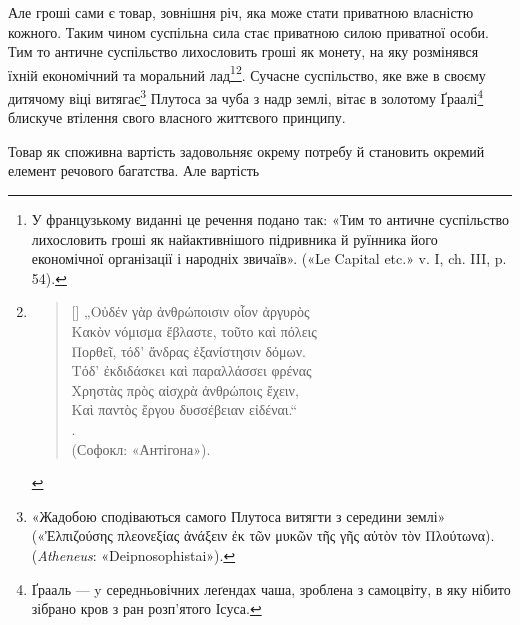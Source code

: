 Але гроші сами є товар, зовнішня річ, яка може стати приватною
власністю кожного. Таким чином суспільна сила стає приватною
силою приватної особи. Тим то античне суспільство лихословить
гроші як монету, на яку розмінявся їхній економічний та моральний
лад\footnote*{
У французькому виданні це речення подано так: «Тим то
античне суспільство лихословить гроші як найактивнішого підривника й руїнника
його економічної організації і народніх звичаїв». («Le Capital etc.» v. I,
ch. III, p. 54). 
}\footnote{
\settowidth{\versewidth}{В усякій справі путь показує безбожну].}
\begin{verse}[\versewidth]
\vspace{-\dimexpr\baselineskip+\topsep}
\textgreek{„Οὐδέν γὰρ ἀνθρώποισιν οἷον ἀργυρὸς \\
Κακὸν νόμισμα ἔβλαστε, τοῦτο καὶ πόλεις \\
Πορθεῖ, τόδ' ἄνδρας ἐξανίστησιν δόμων. \\
Τόδ’ ἐκδιδάσκει καὶ παραλλάσσει φρένας \\
Χρηστὰς πρὸς αἰσχρὰ ἀνθρώποις ἔχειν, \\
Καὶ παντὸς ἔργου δυσσέβειαν εἰδέναι.“} \\
. \\
\smallskip
(Софокл: «Антігона»).
\end{verse}
}. Сучасне суспільство, яке вже в своєму дитячому
віці витягає\footnote{
«Жадобою сподіваються самого Плутоса витягти з середини землі»
(«\textgreek{Ἐλπιζούσης  πλεονεξίας ἀνάξειν ἐκ τῶν μυκῶν τῆς γῆς αὐτὸν τὸν Πλούτωνα}). (\emph{Atheneus}:
«Deipnosophistai»).
} Плутоса за чуба з надр землі, вітає в золотому
Ґраалі\footnote*{
Ґрааль — y середньовічних леґендах чаша, зроблена з самоцвіту,
в яку нібито зібрано кров з ран розп’ятого Ісуса. 
} блискуче втілення свого власного життєвого принципу.

Товар як споживна вартість задовольняє окрему потребу й
становить окремий елемент речового багатства. Але вартість
\parbreak{}  %
